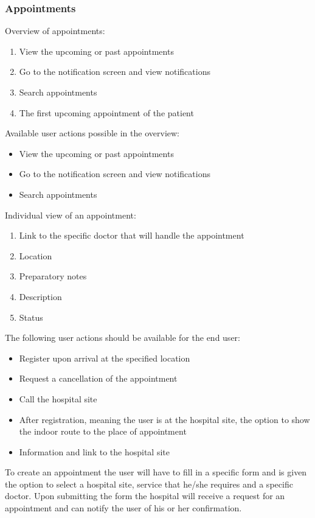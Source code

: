 \subsubsection{Appointments}
Overview of appointments:
\begin{enumerate}
\item View the upcoming or past appointments
\item Go to the notification screen and view notifications
\item Search appointments
\item The first upcoming appointment of the patient
\end{enumerate}
Available user actions possible in the overview:
\begin{itemize}
\item View the upcoming or past appointments
\item Go to the notification screen and view notifications
\item Search appointments
\end{itemize}
Individual view of an appointment:
\begin{enumerate}
\item Link to the specific doctor that will handle the appointment
\item Location
\item Preparatory notes
\item Description
\item Status
\end{enumerate}
The following user actions should be available for the end user:
\begin{itemize}
\item Register upon arrival at the specified location
\item Request a cancellation of the appointment
\item Call the hospital site
\item  After registration, meaning the user is at the hospital site, the option to show the indoor route to the place of appointment
\item Information and link to the hospital site
\end{itemize}
To create an appointment the user will have to fill in a specific form and is given the option to select a hospital site, service that he/she requires and a specific doctor. Upon submitting the form the hospital will receive a request for an appointment and can notify the user of his or her confirmation.

